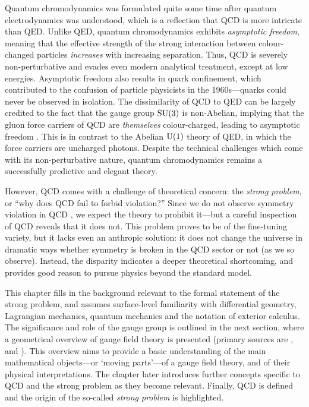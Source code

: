 Quantum chromodynamics was formulated quite some time after quantum electrodynamics was understood, which is a reflection that QCD is more intricate than QED.
Unlike QED, quantum chromodynamics exhibits \emph{asymptotic freedom}, meaning that the effective strength of the strong interaction between colour-changed particles \emph{increases} with increasing separation.
Thus, QCD is severely non-perturbative and evades even modern analytical treatment, except at low energies.
Asymptotic freedom also results in quark confinement, which contributed to the confusion of particle physicists in the 1960s---quarks could never be observed in isolation.
The dissimilarity of QCD to QED can be largely credited to the fact that the gauge group $\mathrm{SU}(3)$ is non-Abelian, implying that the gluon force carriers of QCD are \emph{themselves} colour-charged, leading to asymptotic freedom \cite{Gross_2005}.
This is in contrast to the Abelian $\mathrm{U}(1)$ theory of QED, in which the force carriers are uncharged photons.
Despite the technical challenges which come with its non-perturbative nature, quantum chromodynamics remains a successfully predictive and elegant theory.

However, QCD comes with a challenge of theoretical concern: the \emph{strong \CP problem}, or ``why does QCD fail to forbid \CP violation?''
Since we do not observe \CP symmetry violation in QCD \cite{ParticleDataGroup-review-2020}, we expect the theory to prohibit it---but a careful inspection of QCD reveals that it does not.
This problem proves to be of the fine-tuning variety, but it lacks even an anthropic solution: it does not change the universe in dramatic ways whether \CP symmetry is broken in the QCD sector or not (as we so observe).
Instead, the disparity indicates a deeper theoretical shortcoming, and provides good reason to pursue physics beyond the standard model.

This chapter fills in the background relevant to the formal statement of the strong \CP problem, and assumes surface-level familiarity with differential geometry, Lagrangian mechanics, quantum mechanics and the notation of exterior calculus.
The significance and role of the gauge group is outlined in the next section, where a geometrical overview of gauge field theory is presented (primary sources are \cite{Hamilton_2017}, \cite{Tong_lecture_notes} and \cite{mitsou2013differential}).
This overview aims to provide a basic understanding of the main mathematical objects---or `moving parts'---of a gauge field theory, and of their physical interpretations.
The chapter later introduces further concepts specific to QCD and the strong \CP problem as they become relevant.
Finally, QCD is defined and the origin of the so-called \emph{strong \CP problem} is highlighted.



